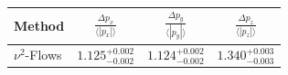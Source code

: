     \begin{tabular}{lccc}
        \toprule
        Method & $\frac{\Delta p_x}{\langle |p_x|\rangle}$ & $\frac{\Delta p_y}{\langle |p_y|\rangle}$ & $\frac{\Delta p_z}{\langle |p_z|\rangle}$ \\
        \midrule
        $\nu^2$-Flows & $1.125^{+0.002}_{-0.002}$ & $1.124^{+0.002}_{-0.002}$ & $1.340^{+0.003}_{-0.003}$ \\
        \bottomrule
    \end{tabular}